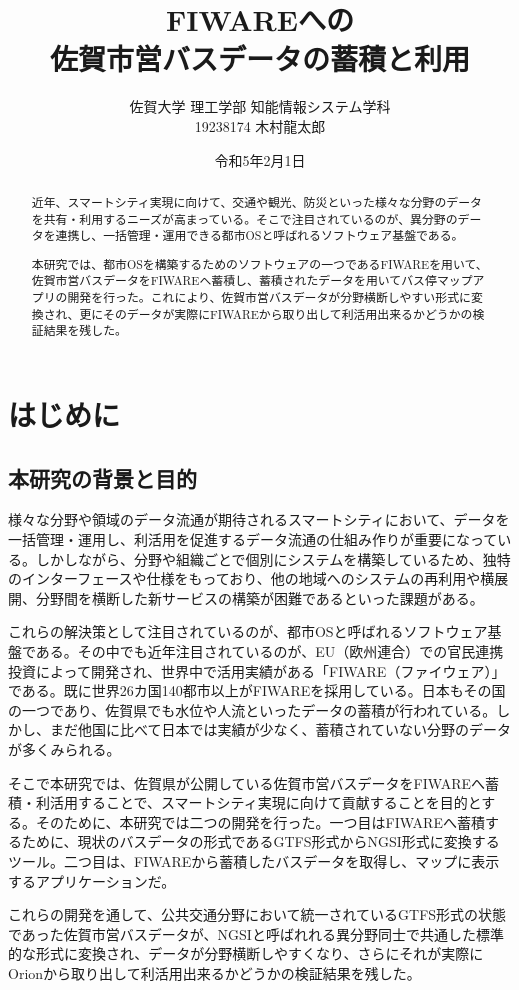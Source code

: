 \documentclass[a4paper, 12pt]{jsreport}
\title{FIWAREへの\\
佐賀市営バスデータの蓄積と利用
}
\author{佐賀大学
理工学部
知能情報システム学科\\
19238174
木村龍太郎}
\date{令和5年2月1日}
\begin{document}
  \maketitle


  \begin{abstract}
    \par 近年、スマートシティ実現に向けて、交通や観光、防災といった様々な分野のデータを共有・利用するニーズが高まっている。そこで注目されているのが、異分野のデータを連携し、一括管理・運用できる都市OSと呼ばれるソフトウェア基盤である。
    \par 本研究では、都市OSを構築するためのソフトウェアの一つであるFIWAREを用いて、佐賀市営バスデータをFIWAREへ蓄積し、蓄積されたデータを用いてバス停マップアプリの開発を行った。これにより、佐賀市営バスデータが分野横断しやすい形式に変換され、更にそのデータが実際にFIWAREから取り出して利活用出来るかどうかの検証結果を残した。
  \end{abstract}

  \tableofcontents

  \chapter{はじめに}
  \section{本研究の背景と目的}
  \par 様々な分野や領域のデータ流通が期待されるスマートシティにおいて、データを一括管理・運用し、利活用を促進するデータ流通の仕組み作りが重要になっている。しかしながら、分野や組織ごとで個別にシステムを構築しているため、独特のインターフェースや仕様をもっており、他の地域へのシステムの再利用や横展開、分野間を横断した新サービスの構築が困難であるといった課題がある。
  \par これらの解決策として注目されているのが、都市OSと呼ばれるソフトウェア基盤である。その中でも近年注目されているのが、EU（欧州連合）での官民連携投資によって開発され、世界中で活用実績がある「FIWARE（ファイウェア）」である。既に世界26カ国140都市以上がFIWAREを採用している。日本もその国の一つであり、佐賀県でも水位や人流といったデータの蓄積が行われている。しかし、まだ他国に比べて日本では実績が少なく、蓄積されていない分野のデータが多くみられる。
  \par そこで本研究では、佐賀県が公開している佐賀市営バスデータ\cite{sagaBusSite}をFIWAREへ蓄積・利活用することで、スマートシティ実現に向けて貢献することを目的とする。そのために、本研究では二つの開発を行った。一つ目はFIWAREへ蓄積するために、現状のバスデータの形式であるGTFS形式からNGSI形式に変換するツール。二つ目は、FIWAREから蓄積したバスデータを取得し、マップに表示するアプリケーションだ。
  \par これらの開発を通して、公共交通分野において統一されているGTFS形式の状態であった佐賀市営バスデータが、NGSIと呼ばれれる異分野同士で共通した標準的な形式に変換され、データが分野横断しやすくなり、さらにそれが実際にOrionから取り出して利活用出来るかどうかの検証結果を残した。
\end{document}
